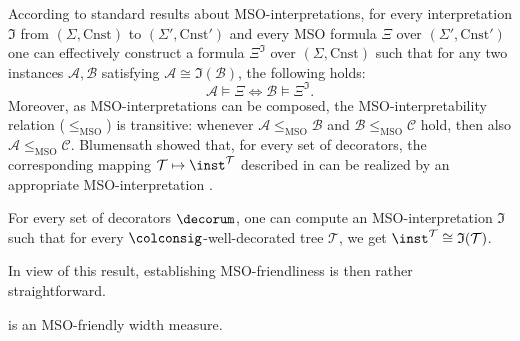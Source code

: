 According to standard results about MSO-interpretations, for every interpretation $\mathfrak{I}$ from $(\Sigma, \mathrm{Cnst})$ to $(\Sigma', \mathrm{Cnst}')$ and every MSO formula $\Xi$ over $(\Sigma', \mathrm{Cnst}')$ one can effectively construct a formula $\Xi^{\mathfrak{I}}$ over $(\Sigma, \mathrm{Cnst})$ such that for any two instances $\mathcal{A}, \mathcal{B}$ satisfying 
$\mathcal{A} \cong \mathfrak{I}(\mathcal{B})$,
the following holds:
$$\mathcal{A} \models \Xi \iff \mathcal{B} \models \Xi^{\mathfrak{I}}.$$%
%
%
Moreover, as MSO-interpretations can be composed, the MSO-interpretability relation ($\leq_{\text{MSO}}$) is transitive:
whenever $\mathcal{A} \leq_{\text{MSO}} \mathcal{B}$ and $\mathcal{B} \leq_{\text{MSO}} \mathcal{C}$ hold, then also $\mathcal{A} \leq_{\text{MSO}} \mathcal{C}$.
Blumensath showed that, for every set of decorators, the corresponding mapping $\mathcal{T} \mapsto \inst^{\mathcal{T}}$ described in 
can be realized by an appropriate MSO-interpretation \cite[Prop. 17]{Blumensath06}.
%
\begin{lemma}\label{lem:computable-mso-tree-interpretations}
For every set of decorators $\decorum$, one can compute an MSO-interpretation $\mathfrak{I}$ such that for every $\colconsig$-well-decorated tree $\mathcal{T}$, we get $\inst^{\mathcal{T}} \cong \mathfrak{I}(\mathcal{T})$.
\end{lemma}
%
\remarkstart
In view of this result, establishing MSO-friendliness is then rather straightforward.
\color{black}
%
\begin{theorem}\label{thm:cliquewidth-k-MSO-decidable}
	\Ercwidth{} is an MSO-friendly width measure.
\end{theorem}
